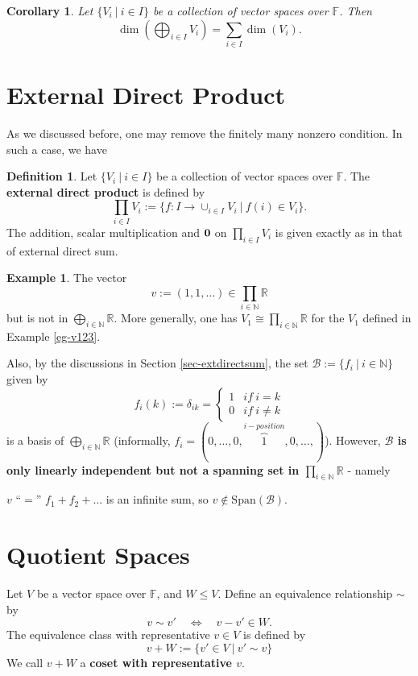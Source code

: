 \documentclass[11pt,openany]{book}
\theoremstyle{plain}
\newtheorem{corollary}[corollary]{Corollary}
\theoremstyle{definition}
\newtheorem{definition}[definition]{Definition}
\newtheorem{example}[example]{Example}
\theoremstyle{remark}
\begin{document}
\begin{corollary}
   Let $\{V_i\ |\ i \in I\}$ be a collection of vector spaces over $\mathbb{F}$. Then 
   $$\dim(\bigoplus_{i \in I} V_i) = \sum_{i \in I} \dim(V_i).$$
\end{corollary}

\section{External Direct Product}
As we discussed before, one may remove the finitely many nonzero condition. In such a case, we have
\begin{definition}
Let $\{V_i\ |\ i \in I\}$ be a collection of vector spaces over $\mathbb{F}$. The {\bf external direct product} is defined by
$$\prod_{i \in I} V_i := \{f: I \to \cup_{i \in I} V_i \ |\ f(i) \in V_i\}.$$
The addition, scalar multiplication and ${\bf 0}$ on $\prod_{i \in I} V_i$ is given exactly as in that of external direct sum.
\end{definition}

\begin{example}
The vector 
    $$v := (1,1, \dots ) \in \prod_{i \in \mathbb{N}} \mathbb{R}$$
but is not in $\bigoplus_{i \in \mathbb{N}} \mathbb{R}$. More generally, one has $V_1 \cong \prod_{i \in \mathbb{N}} \mathbb{R}$ for the $V_1$ defined in Example \ref{eg-v123}.

Also, by the discussions in Section \ref{sec-extdirectsum}, the set 
$\mathcal{B} := \{f_i\ |\ i \in \mathbb{N}\}$
given by 
$$f_i(k) := \delta_{ik} = \begin{cases} 1 & if\ i = k \\ 0 & if\ i \neq k \end{cases}$$ is a basis of $\bigoplus_{i \in \mathbb{N}} \mathbb{R}$ (informally, $f_i = (0, \dots, 0, \overbrace{1}^{i-position}, 0, \dots, )$). However, {\bf $\mathcal{B}$ is only linearly independent but  not a spanning set in $\prod_{i \in \mathbb{N}} \mathbb{R}$} - namely
\begin{center}
    $v$ ``$=$'' $f_1 + f_2 + \dots$ is an infinite sum, so $v \notin \mathrm{Span}(\mathcal{B})$.
\end{center}
\end{example}


\section{Quotient Spaces}
Let $V$ be a vector space over $\mathbb{F}$, and $W \leq V$. Define an equivalence relationship $\sim$ by
$$v \sim v' \quad \Longleftrightarrow \quad v - v' \in W.$$
The equivalence class with representative $v \in V$ is defined by
$$v + W := \{v' \in V\ |\ v' \sim v\}$$
We call $v + W$ a {\bf coset with representative $v$}.
\end{document}
